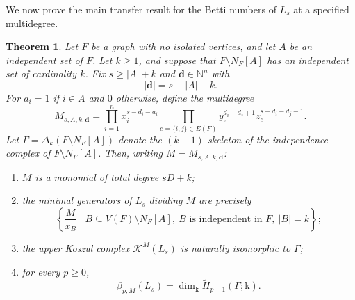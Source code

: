 \documentclass[12pt]{amsart}
\newtheorem{theorem}{Theorem}[section]
\theoremstyle{definition}
\theoremstyle{remark}
\begin{document}
We now prove the main transfer result for the Betti numbers of $L_s$ at a specified multidegree.
\begin{theorem}\label{thm:transfer}
Let $F$ be a graph with no isolated vertices, and let $A$ be an independent set of $F$. Let $k \ge 1$, and suppose that $F \setminus N_F[A]$ has an independent set of cardinality $k$. Fix $s \ge |A| + k$ and $\mathbf{d} \in \mathbb{N}^n$ with
\[
|\mathbf{d}| = s - |A| - k.
\]
For $a_i = 1$ if $i \in A$ and $0$ otherwise, define the multidegree
\begin{equation}\label{eq:multidegree}
M_{s,A,k,\mathbf{d}} = \prod_{i=1}^n x_i^{s - d_i - a_i} \prod_{e=\{i,j\} \in E(F)} y_e^{d_i + d_j + 1} z_e^{s - d_i - d_j - 1}.
\end{equation}
Let $\Gamma = \Delta_{k}(F \setminus N_F[A])$ denote the $(k-1)$-skeleton of the independence complex of $F \setminus N_F[A]$. Then, writing $M = M_{s,A,k,\mathbf{d}}$:
\begin{enumerate}
\item $M$ is a monomial of total degree $sD + k$;
\item the minimal generators of $L_s$ dividing $M$ are precisely
\begin{equation}\label{eq:divisors}
\left\{ \frac{M}{x_B} \;\Bigg|\; B \subseteq V(F) \setminus N_F[A], \ B \text{ is independent in } F, \ |B| = k \right\};
\end{equation}
\item the upper Koszul complex $\mathcal{K}^M(L_s)$ is naturally isomorphic to $\Gamma$;
\item for every $p \ge 0$,
\begin{equation}\label{eq:transfer}
\beta_{p,M}(L_s) = \dim_{\mathrm{k}} \widetilde{H}_{p-1}(\Gamma; \mathrm{k}).
\end{equation}
\end{enumerate}
\end{theorem}
\end{document}
